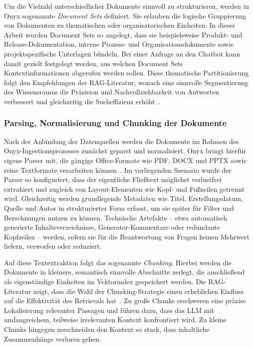 Um die Vielzahl unterschiedlicher Dokumente sinnvoll zu strukturieren, werden in Onyx sogenannte \emph{Document Sets} definiert.
Sie erlauben die logische Gruppierung von Dokumenten zu thematischen oder organisatorischen Einheiten.
In dieser Arbeit wurden Document Sets so angelegt, dass sie beispielsweise Produkt- und Release-Dokumentation, interne Prozess- und Organisationsdokumente sowie projektspezifische Unterlagen bündeln.
Bei einer Anfrage an den Chatbot kann damit gezielt festgelegt werden, aus welchen Document Sets Kontextinformationen abgerufen werden sollen.
Diese thematische Partitionierung folgt den Empfehlungen der RAG-Literatur, wonach eine sinnvolle Segmentierung des Wissensraums die Präzision und Nachvollziehbarkeit von Antworten verbessert und gleichzeitig die Sucheffizienz erhöht~\cite{gao2023retrieval}.

\subsubsection{Parsing, Normalisierung und Chunking der Dokumente}

Nach der Anbindung der Datenquellen werden die Dokumente im Rahmen des Onyx-Ingestionsprozesses zunächst geparst und normalisiert.
Onyx bringt hierfür eigene Parser mit, die gängige Office-Formate wie PDF, DOCX und PPTX sowie reine Textformate verarbeiten können~\cite{onyx_docs}.
Im vorliegenden Szenario wurde der Parser so konfiguriert, dass der eigentliche Fließtext möglichst verlustfrei extrahiert und zugleich von Layout-Elementen wie Kopf- und Fußzeilen getrennt wird.
Gleichzeitig werden grundlegende Metadaten wie Titel, Erstellungsdatum, Quelle und Autor in strukturierter Form erfasst, um sie später für Filter und Berechnungen nutzen zu können.
Technische Artefakte – etwa automatisch generierte Inhaltsverzeichnisse, Generator-Kommentare oder redundante Kopfzeilen – werden, sofern sie für die Beantwortung von Fragen keinen Mehrwert liefern, verworfen oder reduziert.

Auf diese Textextraktion folgt das sogenannte \emph{Chunking}.
Hierbei werden die Dokumente in kleinere, semantisch sinnvolle Abschnitte zerlegt, die anschließend als eigenständige Einheiten im Vektorindex gespeichert werden.
Die RAG-Literatur zeigt, dass die Wahl der Chunking-Strategie einen erheblichen Einfluss auf die Effektivität des Retrievals hat~\cite{gao2023retrieval}.
Zu große Chunks erschweren eine präzise Lokalisierung relevanter Passagen und führen dazu, dass das LLM mit umfangreichem, teilweise irrelevanten Kontext konfrontiert wird.
Zu kleine Chunks hingegen zerschneiden den Kontext so stark, dass inhaltliche Zusammenhänge verloren gehen.


